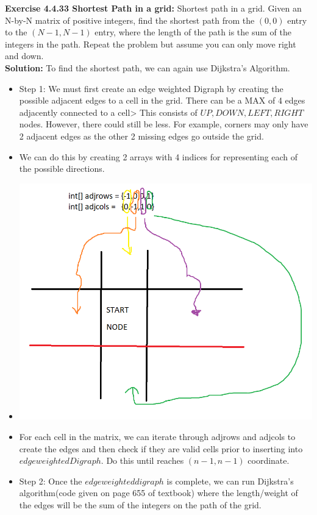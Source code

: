 \documentclass[11pt,fleqn]{article}
\begin{document}
\textbf{Exercise 4.4.33 Shortest Path in a grid:} Shortest path in a grid. Given an N-by-N matrix of positive integers, find the
shortest path from the $(0, 0)$ entry to the $(N-1, N-1)$ entry, where the length of the
path is the sum of the integers in the path. Repeat the problem but assume you can only
move right and down.\\

\textbf{Solution:} To find the shortest path, we can again use Dijkstra's Algorithm.

\begin{itemize}
	\item Step 1: We must first create an edge weighted Digraph by creating the possible adjacent edges to a cell in the grid. There can be a MAX of 4 edges adjacently connected to a cell> This consists of $UP,DOWN,LEFT,RIGHT$ nodes. However, there could still be less. For example, corners may only have 2 adjacent edges as the other 2 missing edges go outside the grid.
	
	\item We can do this by creating 2 arrays with 4 indices for representing each of the possible directions.
	
	\item \includegraphics[scale=0.7]{4.4.33.png}
	
	\item For each cell in the matrix, we can iterate through adjrows and adjcols to create the edges and then check if they are valid cells prior to inserting into $edgeweightedDigraph$. Do this until reaches $(n-1,n-1)$ coordinate.
	
	\newpage
	
	\item Step 2: Once the $edgeweighteddigraph$ is complete, we can run Dijkstra's algorithm(code given on page 655 of textbook) where the length/weight of the edges will be the sum of the integers on the path of the grid.
\end{itemize}
\end{document}
